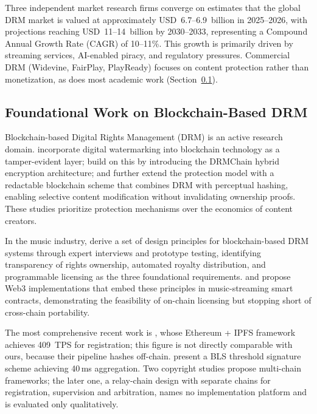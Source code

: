 Three independent market research firms \citep{marketsandMarkets2025, mordorIntelligence2026, grandViewResearch2025} converge on estimates that the global DRM market is valued at approximately USD~6.7--6.9~billion in 2025--2026, with projections reaching USD~11--14~billion by 2030--2033, representing a Compound Annual Growth Rate (CAGR) of 10--11\%. This growth is primarily driven by streaming services, AI-enabled piracy, and regulatory pressures. Commercial DRM (Widevine, FairPlay, PlayReady) focuses on content protection rather than monetization, as does most academic work (Section~\ref{subsec:foundational-drm}).

\subsection{Foundational Work on Blockchain-Based DRM}\label{subsec:foundational-drm}

Blockchain-based Digital Rights Management (DRM) is an active research domain. \citet{garbaEtAl2021} incorporate digital watermarking into blockchain technology as a tamper-evident layer; \citet{patilEtAl2022} build on this by introducing the DRMChain hybrid encryption architecture; and \citet{yiEtAl2023} further extend the protection model with a redactable blockchain scheme that combines DRM with perceptual hashing, enabling selective content modification without invalidating ownership proofs. These studies prioritize protection mechanisms over the economics of content creators.

In the music industry, \citet{cirelloEtAl2023} derive a set of design principles for blockchain-based DRM systems through expert interviews and prototype testing, identifying transparency of rights ownership, automated royalty distribution, and programmable licensing as the three foundational requirements. \citet{cherdakovEtAl2023} and \citet{mendozaTelloEtAl2024} propose Web3 implementations that embed these principles in music-streaming smart contracts, demonstrating the feasibility of on-chain licensing but stopping short of cross-chain portability.

The most comprehensive recent work is \citet{madapatiPradhan2025}, whose Ethereum + IPFS framework achieves 409~TPS for registration; this figure is not directly comparable with ours, because their pipeline hashes off-chain. \citet{wangEtAl2025} present a BLS threshold signature scheme achieving 40\,ms aggregation. Two copyright studies \citep{xieLiu2022, xieTang2024a} propose multi-chain frameworks; the later one, a relay-chain design with separate chains for registration, supervision and arbitration, names no implementation platform and is evaluated only qualitatively.

